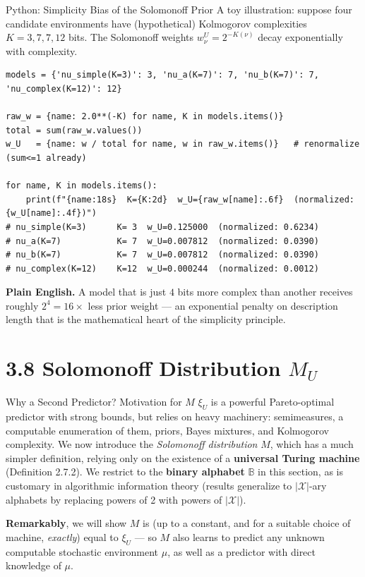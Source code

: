 \documentclass[aspectratio=169,10pt]{beamer}
\newcommand{\B}{\mathbb{B}}
\newcommand{\X}{\mathcal{X}}
\begin{document}
\begin{frame}[fragile]{Python: Simplicity Bias of the Solomonoff Prior}
  A toy illustration: suppose four candidate environments have
  (hypothetical) Kolmogorov complexities $K=3,7,7,12$ bits. The Solomonoff
  weights $w_\nu^U=2^{-K(\nu)}$ decay exponentially with complexity.
\begin{lstlisting}
models = {'nu_simple(K=3)': 3, 'nu_a(K=7)': 7, 'nu_b(K=7)': 7, 'nu_complex(K=12)': 12}

raw_w = {name: 2.0**(-K) for name, K in models.items()}
total = sum(raw_w.values())
w_U   = {name: w / total for name, w in raw_w.items()}   # renormalize (sum<=1 already)

for name, K in models.items():
    print(f"{name:18s}  K={K:2d}  w_U={raw_w[name]:.6f}  (normalized: {w_U[name]:.4f})")
# nu_simple(K=3)      K= 3  w_U=0.125000  (normalized: 0.6234)
# nu_a(K=7)           K= 7  w_U=0.007812  (normalized: 0.0390)
# nu_b(K=7)           K= 7  w_U=0.007812  (normalized: 0.0390)
# nu_complex(K=12)    K=12  w_U=0.000244  (normalized: 0.0012)
\end{lstlisting}
  \textbf{Plain English.} A model that is just $4$ bits more complex than
  another receives roughly $2^4=16\times$ less prior weight --- an
  exponential penalty on description length that is the mathematical heart
  of the simplicity principle.
\end{frame}

\section{3.8 Solomonoff Distribution $M_U$}

\begin{frame}{Why a Second Predictor? Motivation for $M$}
  $\xi_U$ is a powerful Pareto-optimal predictor with strong bounds, but
  relies on heavy machinery: semimeasures, a computable enumeration of them,
  priors, Bayes mixtures, and Kolmogorov complexity. We now introduce the
  \emph{Solomonoff distribution} $M$, which has a much simpler definition,
  relying only on the existence of a \textbf{universal Turing machine}
  (Definition 2.7.2). We restrict to the \textbf{binary alphabet} $\B$ in
  this section, as is customary in algorithmic information theory (results
  generalize to $|\X|$-ary alphabets by replacing powers of 2 with powers of
  $|\X|$).

  \vspace{2mm}
  \textbf{Remarkably}, we will show $M$ is (up to a constant, and for a
  suitable choice of machine, \emph{exactly}) equal to $\xi_U$ --- so $M$
  also learns to predict any unknown computable stochastic environment
  $\mu$, as well as a predictor with direct knowledge of $\mu$.
\end{frame}
\end{document}
